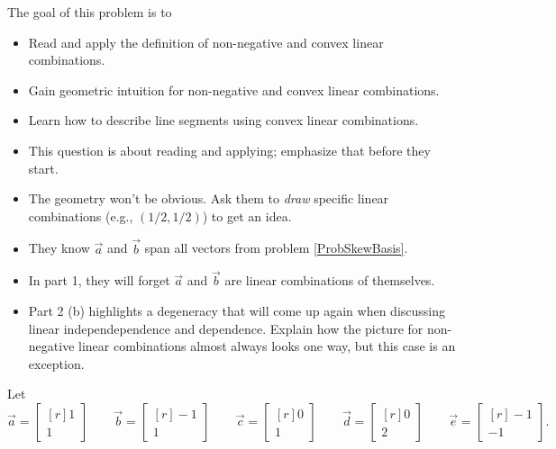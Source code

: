 \documentclass{problemset}
\newcommand{\mat}[1]{\begin{bmatrix*}[r]#1\end{bmatrix*}}
\begin{document}
	\question
	\begin{annotation}
		\begin{goals}

			The goal of this problem is to
			\begin{itemize}
				\item Read and apply the definition of non-negative and convex
					linear combinations.
				\item Gain geometric intuition for non-negative and convex linear
					combinations.
				\item Learn how to describe line segments using
					convex linear combinations.
			\end{itemize}
		\end{goals}

		\begin{notes}
			\begin{itemize}
				\item This question is about reading and applying;
					emphasize that before they start.
				\item The geometry won't be obvious. Ask them to \emph{draw} specific
					linear combinations (e.g., $(1/2,1/2)$) to get an idea.
				\item They know $\vec a$ and $\vec b$ span all vectors from problem \ref{ProbSkewBasis}.
				\item In part 1, they will forget $\vec a$ and $\vec b$ are linear combinations of themselves.
				\item Part 2 (b) highlights a degeneracy that will come up again when discussing linear independependence
					and dependence. Explain how the picture for non-negative linear combinations
					almost always looks one way, but this case is an exception.
			\end{itemize}
		\end{notes}
	\end{annotation}
	Let
	\[
		\vec a=\mat{1\\1} \qquad \vec b=\mat{-1\\1}\qquad \vec c=\mat{0\\1}\qquad\vec d=\mat{0\\2}\qquad\vec e=\mat{-1\\-1}.
	\]
\end{document}
